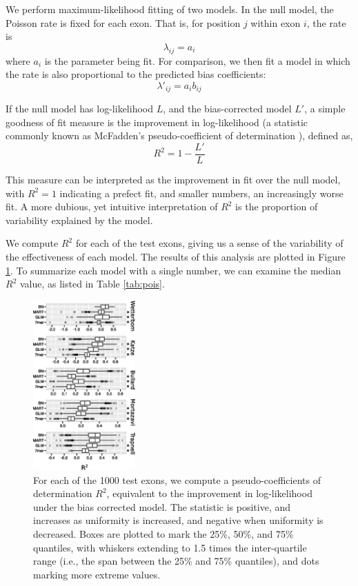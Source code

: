 \documentclass{bioinfo}
\begin{document}
We perform maximum-likelihood fitting of two models. In the null model, the
Poisson rate is fixed for each exon. That is, for position $j$ within
exon $i$, the rate is
$$ \lambda_{ij} = a_i $$
where $a_i$ is the parameter being fit. For comparison, we then fit a model in
which the rate is also proportional to the predicted bias coefficients:
$$ \lambda'_{ij} = a_i b_{ij} $$

If the null model has log-likelihood $L$, and the bias-corrected model $L'$, a
simple goodness of fit measure is the improvement in log-likelihood (a statistic
commonly known as McFadden's pseudo-coefficient of determination
\citep{McFadden1974}), defined as,
$$R^2 = 1 - \frac{L'}{L}$$

This measure can be interpreted as the improvement in fit over the null model,
with $R^2 = 1$ indicating a prefect fit, and smaller numbers, an increasingly
worse fit. A more dubious, yet intuitive interpretation of $R^2$ is the
proportion of variability explained by the model.

We compute $R^2$ for each of the test exons, giving us a sense of the variability
of the effectiveness of each model. The results of this analysis are plotted in
Figure \ref{fig:pois}.  To summarize each model with a single number, we can
examine the median $R^2$ value, as listed in Table \ref{tab:pois}.

\begin{figure}
\centerline{\includegraphics[width=0.35\textwidth]{pois-boxplot.eps}}
\caption{For each of the 1000 test exons, we compute a pseudo-coefficients of
determination $R^2$, equivalent to the improvement in log-likelihood under the
bias corrected model. The statistic is positive, and increases as uniformity is
increased, and negative when uniformity is decreased. Boxes are plotted to mark
the 25\%, 50\%, and 75\% quantiles, with whiskers extending to 1.5 times the
inter-quartile range (i.e., the span between the 25\% and 75\% quantiles), and
dots marking more extreme values.
}


    \label{fig:pois}
\end{figure}
\end{document}
